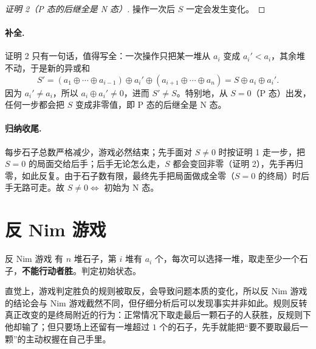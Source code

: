 \documentclass[UTF8,a4paper,11pt,oneside,openany,fontset=fandol]{ctexbook}
\theoremstyle{definition}
\begin{document}
\begin{proof}[证明 2（P 态的后继全是 N 态）]
操作一次后 $S$ 一定会发生变化。
\end{proof}
\paragraph{补全.} 证明 2 只有一句话，值得写全：一次操作只把某一堆从 $a_i$ 变成 $a_i'<a_i$，其余堆不动，于是新的异或和
\[
 S'=(a_1\oplus\cdots\oplus a_{i-1})\oplus a_i'\oplus(a_{i+1}\oplus\cdots\oplus a_n)=S\oplus a_i\oplus a_i'.
\]
因为 $a_i'\ne a_i$，所以 $a_i\oplus a_i'\ne0$，进而 $S'\ne S$。特别地，从 $S=0$（P 态）出发，任何一步都会把 $S$ 变成非零值，即 P 态的后继全是 N 态。

\paragraph{归纳收尾.} 每步石子总数严格减少，游戏必然结束；先手面对 $S\ne0$ 时按证明 1 走一步，把 $S=0$ 的局面交给后手；后手无论怎么走，$S$ 都会变回非零（证明 2），先手再归零，如此反复。由于石子数有限，最终先手把局面做成全零（$S=0$ 的终局）时后手无路可走。故 $S\ne0\iff$ 初始为 N 态。

\section{反 Nim 游戏}
\begin{problem}{反 Nim 游戏}
有 $n$ 堆石子，第 $i$ 堆有 $a_i$ 个，每次可以选择一堆，取走至少一个石子，\textbf{不能行动者胜}。判定初始状态。
\end{problem}

直觉上，游戏判定胜负的规则被取反，会导致问题本质的变化，所以反 Nim 游戏的结论会与 Nim 游戏截然不同，但仔细分析后可以发现事实并非如此。规则反转真正改变的是终局附近的行为：正常情况下取走最后一颗石子的人获胜，反规则下他却输了；但只要场上还留有一堆超过 $1$ 个的石子，先手就能把“要不要取最后一颗”的主动权握在自己手里。
\end{document}
